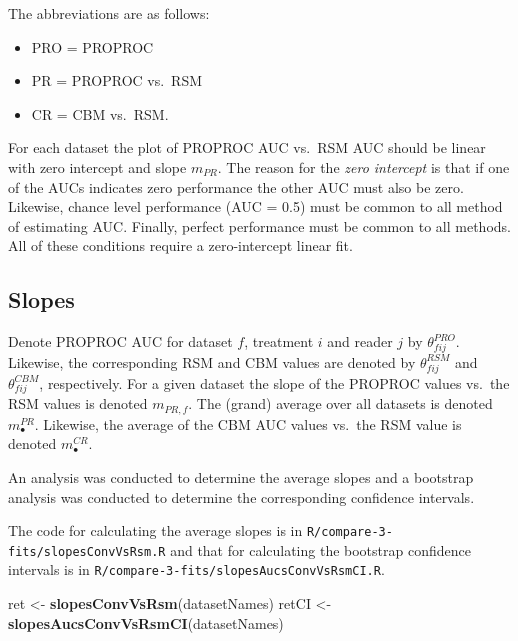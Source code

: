 \documentclass[
]{book}
\newenvironment{Shaded}{\begin{snugshade}}{\end{snugshade}}
\newcommand{\KeywordTok}[1]{\textcolor[rgb]{0.13,0.29,0.53}{\textbf{#1}}}
\newcommand{\NormalTok}[1]{#1}
\newcommand{\StringTok}[1]{\textcolor[rgb]{0.31,0.60,0.02}{#1}}
\providecommand{\tightlist}{%
  \setlength{\itemsep}{0pt}\setlength{\parskip}{0pt}}
\begin{document}
The abbreviations are as follows:

\begin{itemize}
\tightlist
\item
  PRO = PROPROC
\item
  PR = PROPROC vs.~RSM
\item
  CR = CBM vs.~RSM.
\end{itemize}

For each dataset the plot of PROPROC AUC vs.~RSM AUC should be linear with zero intercept and slope \(m_{PR}\). The reason for the \emph{zero intercept} is that if one of the AUCs indicates zero performance the other AUC must also be zero. Likewise, chance level performance (AUC = 0.5) must be common to all method of estimating AUC. Finally, perfect performance must be common to all methods. All of these conditions require a zero-intercept linear fit.

\hypertarget{rsm-3-fits-slopes}{%
\subsection{Slopes}\label{rsm-3-fits-slopes}}

Denote PROPROC AUC for dataset \(f\), treatment \(i\) and reader \(j\) by \(\theta^{PRO}_{fij}\). Likewise, the corresponding RSM and CBM values are denoted by \(\theta^{RSM}_{fij}\) and \(\theta^{CBM}_{fij}\), respectively. For a given dataset the slope of the PROPROC values vs.~the RSM values is denoted \(m_{PR,f}\). The (grand) average over all datasets is denoted \(m^{PR}_\bullet\). Likewise, the average of the CBM AUC values vs.~the RSM value is denoted \(m^{CR}_\bullet\).

An analysis was conducted to determine the average slopes and a bootstrap analysis was conducted to determine the corresponding confidence intervals.

The code for calculating the average slopes is in \texttt{R/compare-3-fits/slopesConvVsRsm.R} and that for calculating the bootstrap confidence intervals is in \texttt{R/compare-3-fits/slopesAucsConvVsRsmCI.R}.

\begin{Shaded}
\begin{Highlighting}[]
\NormalTok{ret <-}\StringTok{ }\KeywordTok{slopesConvVsRsm}\NormalTok{(datasetNames)}
\NormalTok{retCI <-}\StringTok{ }\KeywordTok{slopesAucsConvVsRsmCI}\NormalTok{(datasetNames)}
\end{Highlighting}
\end{Shaded}
\end{document}
